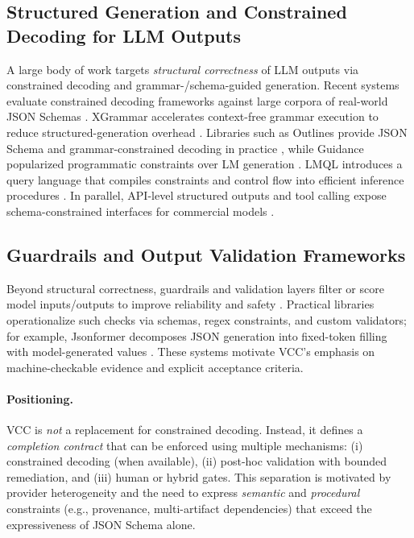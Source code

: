 \documentclass[11pt]{article}
\begin{document}
\subsection{Structured Generation and Constrained Decoding for LLM Outputs}
A large body of work targets \emph{structural correctness} of LLM outputs via constrained decoding and grammar-/schema-guided generation.
Recent systems evaluate constrained decoding frameworks against large corpora of real-world JSON Schemas \cite{jsonschemabench_arxiv}.
XGrammar accelerates context-free grammar execution to reduce structured-generation overhead \cite{xgrammar_arxiv}.
Libraries such as Outlines provide JSON Schema and grammar-constrained decoding in practice \cite{outlines_docs}, while Guidance popularized programmatic constraints over LM generation \cite{guidance_msr, llguidance_go_brrr, llguidance_repo}.
LMQL introduces a query language that compiles constraints and control flow into efficient inference procedures \cite{lmql_paper}.
In parallel, API-level structured outputs and tool calling expose schema-constrained interfaces for commercial models \cite{openai_structured_outputs_blog, openai_structured_outputs_docs, anthropic_advanced_tool_use}.


\subsection{Guardrails and Output Validation Frameworks}
Beyond structural correctness, guardrails and validation layers filter or score model inputs/outputs to improve reliability and safety \cite{guardrails_position_paper}.
Practical libraries operationalize such checks via schemas, regex constraints, and custom validators; for example, Jsonformer decomposes JSON generation into fixed-token filling with model-generated values \cite{jsonformer_repo}.
These systems motivate VCC's emphasis on machine-checkable evidence and explicit acceptance criteria.


\paragraph{Positioning.}
VCC is \emph{not} a replacement for constrained decoding. Instead, it defines a \emph{completion contract} that can be enforced using multiple mechanisms:
(i) constrained decoding (when available), (ii) post-hoc validation with bounded remediation, and (iii) human or hybrid gates.
This separation is motivated by provider heterogeneity and the need to express \emph{semantic} and \emph{procedural} constraints (e.g., provenance, multi-artifact dependencies) that exceed the expressiveness of JSON Schema alone.
\end{document}
